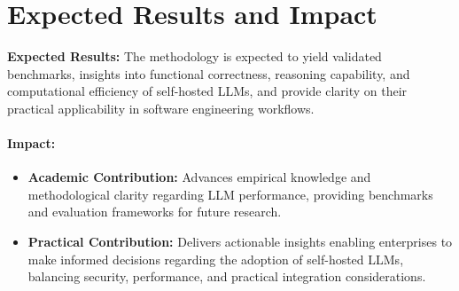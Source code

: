 \section{Expected Results and Impact}
\label{sec:expected-results-and-impact}

\textbf{Expected Results:} The methodology is expected to yield validated benchmarks, insights into functional correctness, reasoning capability, and computational efficiency of self-hosted LLMs, and provide clarity on their practical applicability in software engineering workflows.

\paragraph{Impact:}


\begin{itemize}
	\item \textbf{Academic Contribution:} Advances empirical knowledge and methodological clarity regarding LLM performance, providing benchmarks and evaluation frameworks for future research.
	\item \textbf{Practical Contribution:} Delivers actionable insights enabling enterprises to make informed decisions regarding the adoption of self-hosted LLMs, balancing security, performance, and practical integration considerations.
\end{itemize}